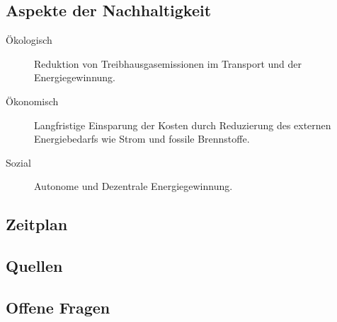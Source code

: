 \documentclass[10pt,paper=a4,final]{scrartcl}
\begin{document}
\subsection*{Aspekte der Nachhaltigkeit}

  \begin{description}
    \item[Ökologisch] Reduktion von Treibhausgasemissionen im Transport und
    der Energiegewinnung.
    \item[Ökonomisch] Langfristige Einsparung der Kosten durch Reduzierung des
    externen Energiebedarfs wie Strom und fossile Brennstoffe.
    \item[Sozial] Autonome und Dezentrale Energiegewinnung.
  \end{description}

\subsection*{Zeitplan}

\subsection*{Quellen}

\subsection*{Offene Fragen}
\end{document}
